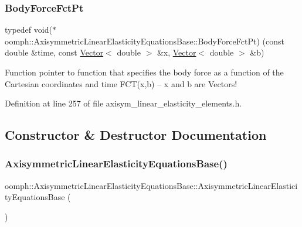 \subsubsection{\texorpdfstring{Body\+Force\+Fct\+Pt}{BodyForceFctPt}}
{\footnotesize\ttfamily typedef void($\ast$ oomph\+::\+Axisymmetric\+Linear\+Elasticity\+Equations\+Base\+::\+Body\+Force\+Fct\+Pt) (const double \&time, const \hyperlink{classoomph_1_1Vector}{Vector}$<$ double $>$ \&x, \hyperlink{classoomph_1_1Vector}{Vector}$<$ double $>$ \&b)}



Function pointer to function that specifies the body force as a function of the Cartesian coordinates and time F\+C\+T(x,b) -- x and b are Vectors! 



Definition at line 257 of file axisym\+\_\+linear\+\_\+elasticity\+\_\+elements.\+h.



\subsection{Constructor \& Destructor Documentation}
\mbox{\label{classoomph_1_1AxisymmetricLinearElasticityEquationsBase_aa37df6e9aef3ee1326187b1c51197527}} 
\subsubsection{\texorpdfstring{Axisymmetric\+Linear\+Elasticity\+Equations\+Base()}{AxisymmetricLinearElasticityEquationsBase()}}
{\footnotesize\ttfamily oomph\+::\+Axisymmetric\+Linear\+Elasticity\+Equations\+Base\+::\+Axisymmetric\+Linear\+Elasticity\+Equations\+Base (\begin{DoxyParamCaption}{ }\end{DoxyParamCaption})\hspace{0.3cm}{\ttfamily [inline]}}



